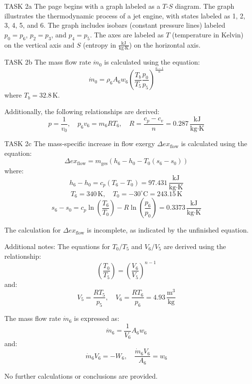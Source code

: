TASK 2a  
The page begins with a graph labeled as a \( T \)-\( S \) diagram. The graph illustrates the thermodynamic process of a jet engine, with states labeled as 1, 2, 3, 4, 5, and 6. The graph includes isobars (constant pressure lines) labeled \( p_0 = p_6 \), \( p_2 = p_3 \), and \( p_4 = p_5 \). The axes are labeled as \( T \) (temperature in Kelvin) on the vertical axis and \( S \) (entropy in \( \frac{\text{kJ}}{\text{kg·K}} \)) on the horizontal axis.  

TASK 2b  
The mass flow rate \( \dot{m}_0 \) is calculated using the equation:  
\[
\dot{m}_0 = \rho_6 A_6 w_6 \left( \frac{T_b}{T_5} \frac{p_0}{p_5} \right)^{\frac{n-1}{n}}
\]  
where \( T_b = 32.8 \, \text{K} \).  

Additionally, the following relationships are derived:  
\[
p = \frac{1}{v_0}, \quad p_6 v_6 = m_6 R T_6, \quad R = \frac{c_p - c_v}{n} = 0.287 \, \frac{\text{kJ}}{\text{kg·K}}
\]  

TASK 2c  
The mass-specific increase in flow exergy \( \Delta ex_{\text{flow}} \) is calculated using the equation:  
\[
\Delta ex_{\text{flow}} = m_{\text{ges}} \left( h_6 - h_0 - T_0 (s_6 - s_0) \right)
\]  
where:  
\[
h_6 - h_0 = c_p (T_6 - T_0) = 97.431 \, \frac{\text{kJ}}{\text{kg·K}}
\]  
\[
T_6 = 340 \, \text{K}, \quad T_0 = -30^\circ\text{C} = 243.15 \, \text{K}
\]  
\[
s_6 - s_0 = c_p \ln \left( \frac{T_6}{T_0} \right) - R \ln \left( \frac{p_6}{p_0} \right) = 0.3373 \, \frac{\text{kJ}}{\text{kg·K}}
\]  

The calculation for \( \Delta ex_{\text{flow}} \) is incomplete, as indicated by the unfinished equation.  

Additional notes:  
The equations for \( T_0 / T_5 \) and \( V_6 / V_5 \) are derived using the relationship:  
\[
\left( \frac{T_0}{T_5} \right) = \left( \frac{V_6}{V_5} \right)^{n-1}
\]  
and:  
\[
V_5 = \frac{R T_5}{p_5}, \quad V_6 = \frac{R T_6}{p_6} = 4.93 \, \frac{\text{m}^3}{\text{kg}}
\]  

The mass flow rate \( \dot{m}_6 \) is expressed as:  
\[
\dot{m}_6 = \frac{1}{V_6} A_6 w_6
\]  
and:  
\[
\dot{m}_6 V_6 = -W_6, \quad \frac{\dot{m}_6 V_6}{A_6} = w_6
\]  

No further calculations or conclusions are provided.